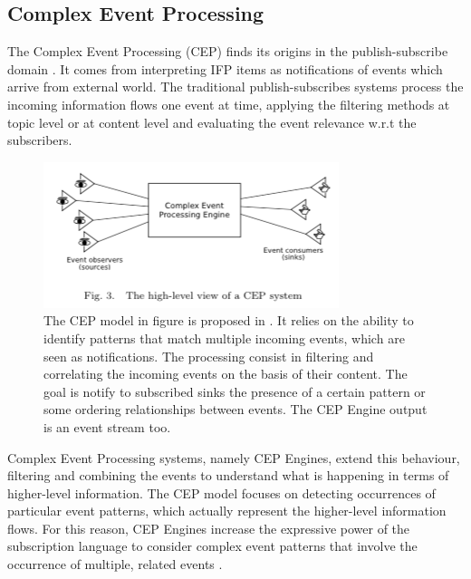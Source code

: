 \subsection{Complex Event Processing}\label{sec:cep}

The Complex Event Processing (CEP) finds its origins in the publish-subscribe domain \cite{Eugster:2003:MFP:857076.857078}. It comes from interpreting IFP items as notifications of events which arrive from  external world. The traditional publish-subscribes systems process the incoming information flows one event at time, applying the filtering methods at topic level or at content level and evaluating the event relevance w.r.t the subscribers. 

\begin{figure}[tbh]
  \centering
	\includegraphics[width=0.75\linewidth]{images/cep}
	\caption[General CEP Model]{The CEP model in figure is proposed in \cite{Cugola:2012:PFI:2187671.2187677}. It relies on the ability to identify patterns that match multiple incoming events, which are seen as notifications. The processing consist in filtering and correlating the incoming events on the basis of their content. The goal is notify to subscribed sinks the presence of a certain pattern or some ordering relationships between events. The CEP Engine output is an event stream too.} 
  	\label{fig:cep}
\end{figure}



Complex Event Processing systems, namely CEP Engines, extend this behaviour, filtering and combining the events to understand what is happening in terms of higher-level information. The CEP model focuses on detecting occurrences of particular event patterns, which actually represent the higher-level information flows. For this reason, CEP Engines increase the expressive power of the subscription language to consider complex event patterns that involve the occurrence of multiple, related events \cite{Cugola:2012:PFI:2187671.2187677}.


